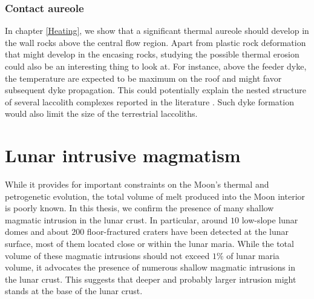 \subsubsection*{Contact aureole}

In chapter \ref{Heating},  we show that a  significant thermal aureole
should develop in the wall rocks above the central flow region.  Apart
from  plastic rock  deformation  that might  develop  in the  encasing
rocks,  studying  the  possible  thermal  erosion  could  also  be  an
interesting thing to look at. For instance, above the feeder dyke, the
temperature are  expected to be  maximum on  the roof and  might favor
subsequent dyke propagation. This could potentially explain the nested
structure of  several laccolith  complexes reported in  the literature
\citep{E:2015tl,Rocchi:2010dn}. Such  dyke formation would  also limit
the size of the terrestrial laccoliths.

\section{Lunar intrusive magmatism}
\label{sec:dynam-shall-magm}

While it provides for important  constraints on the Moon's thermal and
petrogenetic evolution,  the total  volume of  melt produced  into the
Moon interior is poorly known. In this thesis, we confirm the presence
of many shallow magmatic intrusion  in the lunar crust. In particular,
around  $10$ low-slope  lunar  domes and  about $200$  floor-fractured
craters have been detected at the  lunar surface, most of them located
close  or within  the lunar  maria. While  the total  volume of  these
magmatic intrusions should not exceed  $1\%$ of lunar maria volume, it
advocates the presence of numerous  shallow magmatic intrusions in the
lunar crust. This  suggests that deeper and  probably larger intrusion
might stands at the base of the lunar crust.




